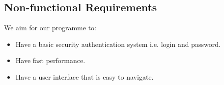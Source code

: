 \subsection{Non-functional Requirements}
We aim for our programme to:
\begin{itemize}
    \item Have a basic security authentication system i.e. login and password.
    \item Have fast performance.
    \item Have a user interface that is easy to navigate.
\end{itemize}
